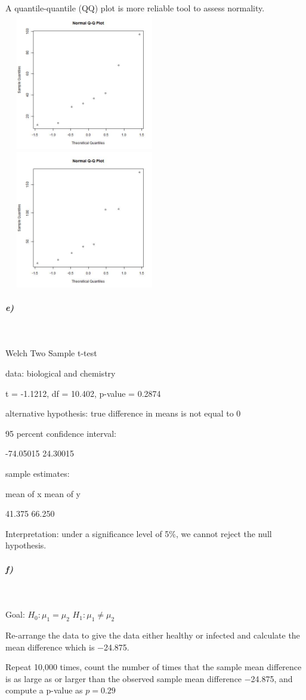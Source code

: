 \documentclass{article}
\begin{document}
\begin{enumerate}
A quantile-quantile (QQ) plot is more reliable tool to assess normality. 
\newline
\includegraphics[height=6cm,width=7cm]{biologicalqq.jpg}
\includegraphics[height=6cm,width=7cm]{chemistryqq.jpg}
\end{enumerate}
\subparagraph{e)}~{}

Welch Two Sample t-test

data:  biological and chemistry

t = -1.1212, df = 10.402, p-value = 0.2874

alternative hypothesis: true difference in means is not equal to 0

95 percent confidence interval:

 -74.05015  24.30015

sample estimates:

mean of x mean of y 

   41.375    66.250 

Interpretation: under a significance level of 5\%, we cannot reject the null hypothesis.
\subparagraph{f)}~{}

Goal: $H_0 : \mu_1 = \mu_2$ $H_1 : \mu_1 \neq \mu_2$

Re-arrange the data to give the data either healthy or infected and calculate the mean difference which is  −24.875.

Repeat 10,000 times, count the number of times that the sample mean difference is as large as or larger than the observed sample mean difference −24.875, and compute a p-value as $p=0.29$
\end{document}
